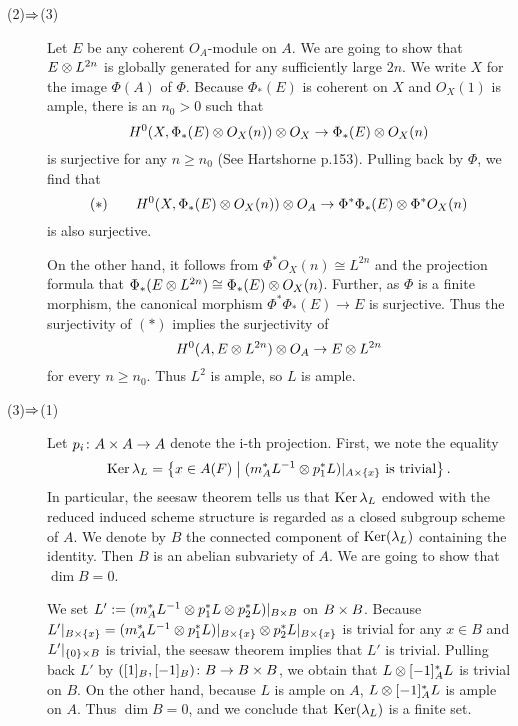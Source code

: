 {\begin{description}
  \item[(2)$\Rightarrow$(3)] Let $E$ be any coherent $O_A$-module on $A$. We are going to show that $E \otimes L^{2n}$ is globally generated for any sufficiently large $2n$. We write $X$ for the image $\Phi(A)$ of $\Phi$. Because $\Phi_*(E)$ is coherent on $X$ and $O_X(1)$ is ample, there is an $n_0 > 0$ such that
  \[
  H^0(X, \Phi_*(E) \otimes O_X(n) ) \otimes O_X \to \Phi_*(E) \otimes O_X(n)
  \]
  is surjective for any $n \geq n_0$ (See Hartshorne p.153). Pulling back by $\Phi$, we find that
  \[
  (*)  \quad  \quad    H^0(X, \Phi_*(E) \otimes O_X(n) ) \otimes O_A \to \Phi^* \Phi_*(E) \otimes \Phi^* O_X(n)
  \]
  is also surjective.

  On the other hand, it follows from $\Phi^* O_X(n) \cong L^{2n}$ and the projection formula that $\Phi_*(E \otimes L^{2n}) \cong \Phi_*(E) \otimes O_X(n)$. Further, as $\Phi$ is a finite morphism, the canonical morphism $\Phi^* \Phi_*(E) \to E$ is surjective. Thus the surjectivity of $(*)$ implies the surjectivity of
  \[
  H^0(A, E \otimes L^{2n} ) \otimes O_A \to E \otimes L^{2n}
  \]
  for every $n \geq n_0$. Thus $L^2$ is ample, so $L$ is ample.

  \item[(3)$\Rightarrow$(1)] Let $p_i \colon A \times A \to A$ denote the i-th projection. First, we note the equality
  \[
  \operatorname{Ker} {\lambda}_L = \left\{  x \in A(F)   \mathrel{} \middle| \mathrel{}  (m_A^* L^{-1} \otimes p_1^* L)|_{A \times \{ x \} } \text{ is trivial}   \right\}.
  \]
  In particular, the seesaw theorem tells us that $\operatorname{Ker} {\lambda}_L$ endowed with the reduced induced scheme structure is regarded as a closed subgroup scheme of $A$. We denote by $B$ the connected component of $\operatorname{Ker}({\lambda}_L)$ containing the identity. Then $B$ is an abelian subvariety of $A$. We are going to show that $\dim B = 0$.

  We set $L' := (m_A^* L^{-1} \otimes p_1^* L \otimes p_2^* L)|_{B \times B}$ on $B \times B$. Because $L'|_{B \times \{x\}} = (m_A^* L^{-1} \otimes p_1^* L)|_{B \times \{x\}} \otimes p_2^* L|_{B \times \{x\}}$ is trivial for any $x \in B$
  and $L'|_{ \{0\} \times B}$ is trivial, the seesaw theorem implies that $L'$ is trivial. Pulling back $L'$ by $([1]_B, [-1]_B) \colon B \to B \times B$, we obtain that $L \otimes [-1]_A^* L $ is trivial on $B$. On the other hand, because $L$ is ample on $A$, $L \otimes [-1]_A^* L$ is ample on $A$. Thus $\dim B = 0$,
   and we conclude that $\operatorname{Ker}({\lambda}_L)$ is a finite set.
  \end{description}

}

